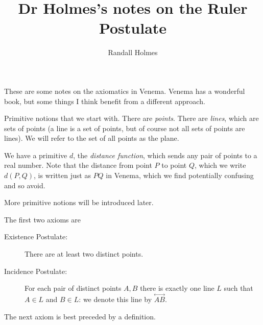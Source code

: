 \documentclass[12pt]{article}
\title{Dr Holmes's notes on the Ruler Postulate}
\author{Randall Holmes}
\newcommand\Line[1]{\overset{\leftrightarrow}{#1}}
\begin{document}
\maketitle

These are some notes on the axiomatics in Venema.  Venema has a wonderful book, but some things I think benefit from a different approach.

Primitive notions that we start with.  There are {\em points\/}.  There are {\em lines\/}, which are sets of points (a line is a set of points, but of course not all sets of points are lines).  We will refer to the set of all points as the plane.

We have a primitive $d$, the {\em distance function\/}, which sends any pair of points to a real number.  
Note that the distance from point $P$ to point $Q$, which we write $d(P,Q)$, is written just as $PQ$ in Venema, which we find potentially confusing and so avoid.

More primitive notions will be introduced later.

The first two axioms are

\begin{description}


\item[Existence Postulate:]  There are at least two distinct points.

\item[Incidence Postulate:]  For each pair of distinct points $A,B$ there is exactly one line $L$ such that
$A \in L$ and $B \in L$:  we denote this line by $\Line{AB}$.

\end{description}

The next axiom is best preceded by a definition.
\end{document}
